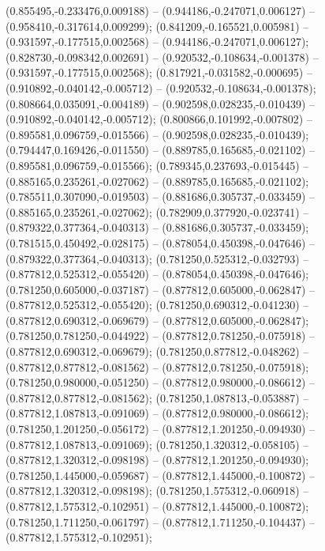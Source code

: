  (0.855495,-0.233476,0.009188) -- (0.944186,-0.247071,0.006127) -- (0.958410,-0.317614,0.009299);
 (0.841209,-0.165521,0.005981) -- (0.931597,-0.177515,0.002568) -- (0.944186,-0.247071,0.006127);
 (0.828730,-0.098342,0.002691) -- (0.920532,-0.108634,-0.001378) -- (0.931597,-0.177515,0.002568);
 (0.817921,-0.031582,-0.000695) -- (0.910892,-0.040142,-0.005712) -- (0.920532,-0.108634,-0.001378);
 (0.808664,0.035091,-0.004189) -- (0.902598,0.028235,-0.010439) -- (0.910892,-0.040142,-0.005712);
 (0.800866,0.101992,-0.007802) -- (0.895581,0.096759,-0.015566) -- (0.902598,0.028235,-0.010439);
 (0.794447,0.169426,-0.011550) -- (0.889785,0.165685,-0.021102) -- (0.895581,0.096759,-0.015566);
 (0.789345,0.237693,-0.015445) -- (0.885165,0.235261,-0.027062) -- (0.889785,0.165685,-0.021102);
 (0.785511,0.307090,-0.019503) -- (0.881686,0.305737,-0.033459) -- (0.885165,0.235261,-0.027062);
 (0.782909,0.377920,-0.023741) -- (0.879322,0.377364,-0.040313) -- (0.881686,0.305737,-0.033459);
 (0.781515,0.450492,-0.028175) -- (0.878054,0.450398,-0.047646) -- (0.879322,0.377364,-0.040313);
 (0.781250,0.525312,-0.032793) -- (0.877812,0.525312,-0.055420) -- (0.878054,0.450398,-0.047646);
 (0.781250,0.605000,-0.037187) -- (0.877812,0.605000,-0.062847) -- (0.877812,0.525312,-0.055420);
 (0.781250,0.690312,-0.041230) -- (0.877812,0.690312,-0.069679) -- (0.877812,0.605000,-0.062847);
 (0.781250,0.781250,-0.044922) -- (0.877812,0.781250,-0.075918) -- (0.877812,0.690312,-0.069679);
 (0.781250,0.877812,-0.048262) -- (0.877812,0.877812,-0.081562) -- (0.877812,0.781250,-0.075918);
 (0.781250,0.980000,-0.051250) -- (0.877812,0.980000,-0.086612) -- (0.877812,0.877812,-0.081562);
 (0.781250,1.087813,-0.053887) -- (0.877812,1.087813,-0.091069) -- (0.877812,0.980000,-0.086612);
 (0.781250,1.201250,-0.056172) -- (0.877812,1.201250,-0.094930) -- (0.877812,1.087813,-0.091069);
 (0.781250,1.320312,-0.058105) -- (0.877812,1.320312,-0.098198) -- (0.877812,1.201250,-0.094930);
 (0.781250,1.445000,-0.059687) -- (0.877812,1.445000,-0.100872) -- (0.877812,1.320312,-0.098198);
 (0.781250,1.575312,-0.060918) -- (0.877812,1.575312,-0.102951) -- (0.877812,1.445000,-0.100872);
 (0.781250,1.711250,-0.061797) -- (0.877812,1.711250,-0.104437) -- (0.877812,1.575312,-0.102951);
